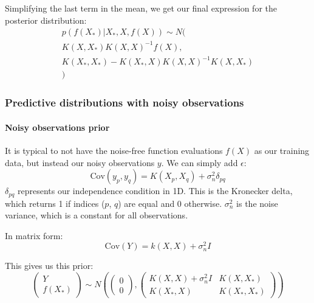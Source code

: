 \documentclass[10pt]{article}
\begin{document}
Simplifying the last term in the mean, we get our final expression for the posterior distribution:
\begin{equation} \label{eq:conditioning}
    \begin{aligned}
        p(f(X_*)|X_*, X, f(X)) \sim N( \\
        K(X,X_*)K(X,X)^{-1}f(X), \\
        K(X_*,X_*) - K(X_*,X)K(X,X)^{-1}K(X,X_*) \\
        )
    \end{aligned}
\end{equation}


\subsubsection{Predictive distributions with noisy observations}
\paragraph{Noisy observations prior}
It is typical to not have the noise-free function evaluations $f(X)$ as our training data, but instead our noisy observations $y$. We can simply add $\epsilon$:
\begin{equation*}
    \text{Cov}(y_p, y_q) = K(X_p, X_q) + \sigma^2_n\delta_{pq}
\end{equation*}
$\delta_{pq}$ represents our independence condition in 1D. This is the Kronecker delta, which returns 1 if indices ($p$, $q$) are equal and 0 otherwise. $\sigma^2_n$ is the noise variance, which is a constant for all observations.
    
In matrix form:
\begin{equation*}
    \text{Cov}(Y) = k(X,X) + \sigma^2_nI
\end{equation*}
    
This gives us this prior:
\begin{equation*}
    \begin{pmatrix}
        Y \\ f(X_*)
    \end{pmatrix} \sim N\left(
    \begin{pmatrix}
        0 \\ 0
    \end{pmatrix},
    \begin{pmatrix}
        K(X,X) + \sigma^2_nI & K(X,X_*) \\ K(X_*,X) & K(X_*,X_*)
    \end{pmatrix}
    \right)
\end{equation*}
\end{document}
